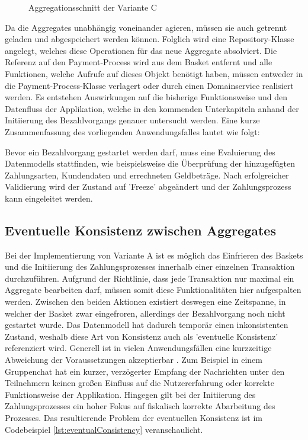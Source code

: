 \begin{figure}[htbp]
	\centering
	
	\caption{Aggregationsschnitt der Variante C}
	\label{fig:VarC}
\end{figure}

Da die Aggregates unabhängig voneinander agieren, müssen sie auch getrennt geladen und abgespeichert werden können. Folglich wird eine Repository-Klasse angelegt, welches diese Operationen für das neue Aggregate absolviert. Die Referenz auf den Payment-Process wird aus dem Basket entfernt und alle Funktionen, welche Aufrufe auf dieses Objekt benötigt haben, müssen entweder in die Payment-Process-Klasse verlagert oder durch einen Domainservice realisiert werden. Es entstehen Auswirkungen auf die bisherige Funktionsweise und den Datenfluss der Applikation, welche in den kommenden Unterkapiteln anhand der Initiierung des Bezahlvorgangs genauer untersucht werden. Eine kurze Zusammenfassung des vorliegenden Anwendungsfalles lautet wie folgt:
 
Bevor ein Bezahlvorgang gestartet werden darf, muss eine Evaluierung des Datenmodells stattfinden, wie beispielsweise die Überprüfung der hinzugefügten Zahlungsarten, Kundendaten und errechneten Geldbeträge. Nach erfolgreicher Validierung wird der Zustand auf 'Freeze' abgeändert und der Zahlungsprozess kann eingeleitet werden.

\subsection{Eventuelle Konsistenz zwischen Aggregates}

Bei der Implementierung von Variante A ist es möglich das Einfrieren des Baskets und die Initiierung des Zahlungsprozesses innerhalb einer einzelnen Transaktion durchzuführen. Aufgrund der Richtlinie, dass jede Transaktion nur maximal ein Aggregate bearbeiten darf, müssen somit diese Funktionalitäten hier aufgespalten werden. Zwischen den beiden Aktionen existiert deswegen eine Zeitspanne, in welcher der Basket zwar eingefroren, allerdings der Bezahlvorgang noch nicht gestartet wurde. Das Datenmodell hat dadurch temporär einen inkonsistenten Zustand, weshalb diese Art von Konsistenz auch als 'eventuelle Konsistenz' referenziert wird. Generell ist in vielen Anwendungsfällen eine kurzzeitige Abweichung der Voraussetzungen akzeptierbar \cite[S. 364f.]{Vernon.2011}. Zum Beispiel in einem Gruppenchat hat ein kurzer, verzögerter Empfang der Nachrichten unter den Teilnehmern keinen großen Einfluss auf die Nutzererfahrung oder korrekte Funktionsweise der Applikation. Hingegen gilt bei der Initiierung des Zahlungsprozesses ein hoher Fokus auf fiskalisch korrekte Abarbeitung des Prozesses. Das resultierende Problem der eventuellen Konsistenz ist im Codebeispiel \ref{lst:eventualConsistency} veranschaulicht.

